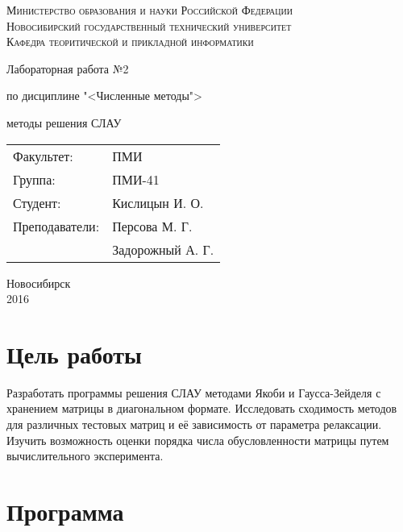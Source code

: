 \documentclass[oneside, final, 12pt]{extarticle}
\begin{document}
\begin{titlepage}
	\begin{centering}
		\textsc{Министерство образования и науки Российской Федерации}\\
		\textsc{Новосибирский государственный технический университет}\\
		\textsc{Кафедра теоритической и прикладной информатики}\\
	\end{centering}
	\vfill
	\vfill
	\vfill
	\Large
	\centerline{Лабораторная работа №2}
	\centerline{по дисциплине "<Численные методы">}
	\centerline{ методы решения СЛАУ}
	\normalsize
	\vfill
	\vfill
	\vfill
	\begin{flushleft}
		\begin{minipage}{0.3\textwidth}
			\begin{tabular}{l l}
				Факультет: & ПМИ\\
				Группа: & ПМИ-41\\
				Студент: & Кислицын И. О.\\
				Преподаватели: & Персова М. Г.\\
				~ & Задорожный А. Г. 
			\end{tabular}
		\end{minipage}
	\end{flushleft}
	\vfill
	\vfill
	\begin{centering}
		Новосибирск\\
		2016\\
	\end{centering}
\end{titlepage}
\setcounter{page}{2}
\lstset{
	breaklines=\true,
	basicstyle=\footnotesize\ttfamily,
	tabsize=2,
	showspaces=\false,
	breaklines=\true,
	breakatwhitespace=\true,
	extendedchars=\true,
	keepspaces=\true,
	language=Haskell
}
\section{Цель работы}

Разработать программы решения СЛАУ методами Якоби и Гаусса-Зейделя с хранением матрицы в диагональном формате. Исследовать сходимость методов для различных тестовых матриц и её зависимость от параметра релаксации. Изучить возможность оценки порядка числа обусловленности матрицы путем вычислительного эксперимента.

\section{Программа}
\end{document}
